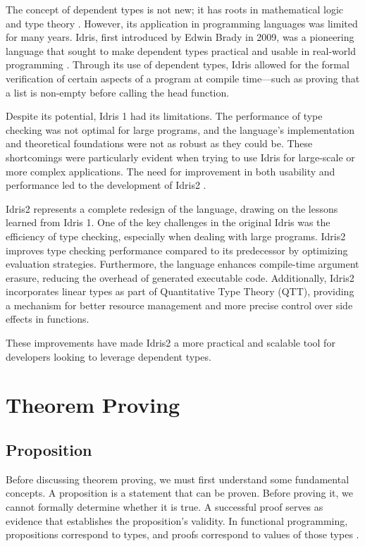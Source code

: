 \documentclass[]{rptuseminar}
\begin{document}
The concept of dependent types is not new; it has roots in mathematical logic and type theory \cite{martin1984intuitionistic}. However, its application in programming languages was limited for many years. Idris, first introduced by Edwin Brady in 2009, was a pioneering language that sought to make dependent types practical and usable in real-world programming \cite{brady2013idris}. Through its use of dependent types, Idris allowed for the formal verification of certain aspects of a program at compile time—such as proving that a list is non-empty before calling the head function.

Despite its potential, Idris 1 had its limitations. The performance of type checking was not optimal for large programs, and the language's implementation and theoretical foundations were not as robust as they could be. These shortcomings were particularly evident when trying to use Idris for large-scale or more complex applications. The need for improvement in both usability and performance led to the development of Idris2 \cite{brady2021idris}.

Idris2 represents a complete redesign of the language, drawing on the lessons learned from Idris 1. One of the key challenges in the original Idris was the efficiency of type checking, especially when dealing with large programs. Idris2 improves type checking performance compared to its predecessor by optimizing evaluation strategies. Furthermore, the language enhances compile-time argument erasure, reducing the overhead of generated executable code. Additionally, Idris2 incorporates linear types as part of Quantitative Type Theory (QTT), providing a mechanism for better resource management and more precise control over side effects in functions.

These improvements have made Idris2 a more practical and scalable tool for developers looking to leverage dependent types.
  

\section{Theorem Proving}
\label{sec:Proposition}

\subsection{Proposition}
Before discussing theorem proving, we must first understand some fundamental concepts. A proposition is a statement that can be proven. Before proving it, we cannot formally determine whether it is true. A successful proof serves as evidence that establishes the proposition's validity. In functional programming, propositions correspond to types, and proofs correspond to values of those types \cite{howard1980formulae}.
\end{document}
